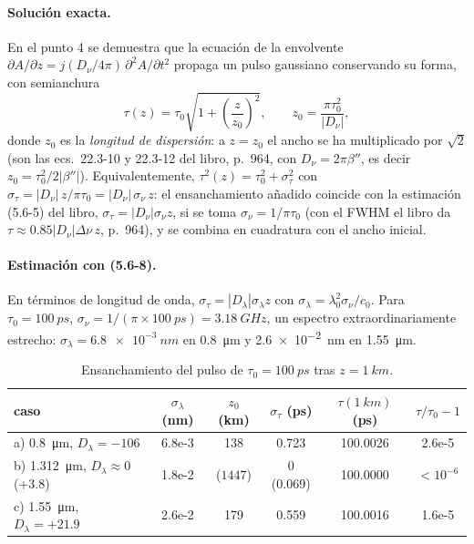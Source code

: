 \documentclass{article}
\newcommand{\Dnu}{D_\nu}
\newcommand{\Dlam}{D_\lambda}
\newcommand{\um}{\si{\micro\metre}}
\begin{document}
\paragraph{Solución exacta.} En el punto 4 se demuestra que la ecuación de la envolvente
$\partial A/\partial z=j(\Dnu/4\pi)\,\partial^2A/\partial t^2$ propaga un pulso gaussiano
conservando su forma, con semianchura
\begin{equation}
\tau(z)=\tau_0\sqrt{1+\left(\frac{z}{z_0}\right)^2},\qquad
z_0=\frac{\pi\tau_0^2}{|\Dnu|},
\label{eq:tau_z}
\end{equation}
donde $z_0$ es la \emph{longitud de dispersión}: a $z=z_0$ el ancho se ha multiplicado por
$\sqrt2$ (son las ecs.~22.3-10 y 22.3-12 del libro, p.~964, con $D_\nu=2\pi\beta''$, es
decir $z_0=\tau_0^2/2|\beta''|$). Equivalentemente, $\tau^2(z)=\tau_0^2+\sigma_\tau^2$ con
$\sigma_\tau=|\Dnu|\,z/\pi\tau_0=|\Dnu|\,\sigma_\nu\,z$: el ensanchamiento añadido coincide con
la estimación (5.6-5) del libro, $\sigma_\tau=|\Dnu|\sigma_\nu z$, si se toma $\sigma_\nu=1/\pi\tau_0$
(con el FWHM el libro da $\tau\approx0.85|\Dnu|\Delta\nu\,z$, p.~964), y se combina en cuadratura con
el ancho inicial.

\paragraph{Estimación con (5.6-8).} En términos de longitud de onda, $\sigma_\tau=|\Dlam|\sigma_\lambda z$
con $\sigma_\lambda=\lambda_0^2\sigma_\nu/c_0$. Para $\tau_0=\SI{100}{ps}$,
$\sigma_\nu=1/(\pi\times\SI{100}{ps})=\SI{3.18}{GHz}$, un espectro extraordinariamente estrecho:
$\sigma_\lambda=\SI{6.8e-3}{nm}$ en \SI{0.8}{\um} y \SI{2.6e-2}{nm} en \SI{1.55}{\um}.

\begin{table}[H]
\centering
\caption{Ensanchamiento del pulso de $\tau_0=\SI{100}{ps}$ tras $z=\SI{1}{km}$.}
\label{tab:p3_anchos}
\begin{tabular}{l S[table-format=1.2e-2] S[table-format=4.0] S[table-format=1.3] S[table-format=3.4] S[table-format=1.1e-1]}
\toprule
caso & {$\sigma_\lambda$ (nm)} & {$z_0$ (km)} & {$\sigma_\tau$ (ps)} & {$\tau(\SI{1}{km})$ (ps)} & {$\tau/\tau_0-1$}\\
\midrule
a) \SI{0.8}{\um}, $\Dlam=-106$   & 6.8e-3 & 138  & 0.723 & 100.0026 & 2.6e-5\\
b) \SI{1.312}{\um}, $\Dlam\approx0$ (+3.8) & 1.8e-2 & {($1447$)} & {0 (0.069)} & {100.0000} & {$<10^{-6}$}\\
c) \SI{1.55}{\um}, $\Dlam=+21.9$ & 2.6e-2 & 179  & 0.559 & 100.0016 & 1.6e-5\\
\bottomrule
\end{tabular}
\end{table}
\end{document}
